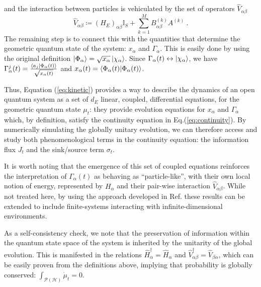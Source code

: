 \documentclass[%
 reprint,
 superscriptaddress,
 aps,
 pra,
]{revtex4-2}
\newcommand{\PH}{\mathcal{P}(\mathcal{H})}
\theoremstyle{definition}
\begin{document}
and the interaction between particles is vehiculated by the set of operators $\hat{V}_{\alpha \beta}$
\begin{equation}
\hat{V}_{\alpha \beta} \coloneqq \left( H_E\right)_{\alpha \beta} \mathbb{I}_S + \sum_{k=1}^M B^{(k)}_{\alpha \beta} A^{(k)}~.\label{ed:def_V}
\end{equation}
The remaining step is to connect this with the quantities that determine the geometric quantum state of the system: $x_\alpha$ and $\Gamma_\alpha$.
This is easily done by using the original definition $\ket{\Phi_\alpha} = \sqrt{x_\alpha} \ket{\chi_\alpha}$. Since $\Gamma_\alpha(t) \leftrightarrow \ket{\chi_\alpha}$,
we have $\Gamma^j_\alpha(t) = \frac{\braket{a_j}{\Phi_\alpha(t)}}{\sqrt{x_\alpha(t)}}$ and $x_\alpha(t) = \braket{\Phi_\alpha(t)}{\Phi_\alpha(t)}$. 



Thus, Equation (\ref{eq:kinetic}) provides a way to describe the dynamics of an open 
quantum system as a set of $d_E$ linear, coupled, differential equations, for the 
geometric quantum state $\mu_t$: they provide evolution equations for $x_\alpha$ and $\Gamma_\alpha$
which, by definition, satisfy the continuity equation in Eq.(\ref{eq:continuity}). By numerically
simulating the globally unitary evolution, we can therefore access and study both
phenomenological terms in the continuity equation: the information flux $J_t$ and
the sink/source term $\sigma_t$.


It is worth noting that the emergence of this set of coupled equations reinforces the 
interpretation of $\Gamma_\alpha(t)$ as behaving as ``particle-like'', with their own local 
notion of energy, represented by $H_\alpha$ and their pair-wise interaction $\hat{V}_{\alpha \beta}$. 
While not treated here, by using the approach developed in Ref.\cite{Anza2021DensityMatricesGeometric} these 
results can be extended to include finite-systems interacting with infinite-dimensional environments.

As a self-consistency check, we note that the preservation of information within the 
quantum state space of the system is inherited by the unitarity of the global evolution. 
This is manifested in the relations $\hat{H}_\alpha^\dagger = \hat{H}_\alpha$ and 
$\hat{V}_{\alpha \beta}^{\dagger} = \hat{V}_{\beta \alpha}$, which can be 
easily proven from the definitions above, implying that 
probability is globally conserved: $\int_{\PH} \dot{\mu}_t = 0$.
\end{document}
